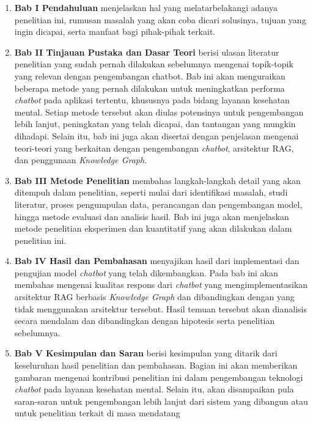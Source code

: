 \begin{enumerate}
	\item \textbf{Bab I Pendahuluan} menjelaskan hal yang melatarbelakangi adanya penelitian ini, rumusan masalah yang akan coba dicari solusinya, tujuan yang ingin dicapai, serta manfaat bagi pihak-pihak terkait.
	\item \textbf{Bab II Tinjauan Pustaka dan Dasar Teori} berisi ulasan literatur penelitian yang sudah pernah dilakukan sebelumnya mengenai topik-topik yang relevan dengan pengembangan chatbot.
	      Bab ini akan menguraikan beberapa metode yang pernah dilakukan untuk meningkatkan performa \textit{chatbot} pada aplikasi tertentu, khususnya pada bidang layanan kesehatan mental.
	      Setiap metode tersebut akan diulas potensinya untuk pengembangan lebih lanjut, peningkatan yang telah dicapai, dan tantangan yang mungkin dihadapi.
	      Selain itu, bab ini juga akan disertai dengan penjelasan mengenai teori-teori yang berkaitan dengan pengembangan \textit{chatbot}, arsitektur RAG, dan penggunaan \textit{Knowledge Graph}.
	\item \textbf{Bab III Metode Penelitian} membahas langkah-langkah detail yang akan ditempuh dalam penelitian, seperti mulai dari identifikasi masalah, studi literatur, proses pengumpulan data, perancangan dan pengembangan model, hingga metode evaluasi dan analisis hasil.
	      Bab ini juga akan menjelaskan metode penelitian eksperimen dan kuantitatif yang akan dilakukan dalam penelitian ini.
	\item \textbf{Bab IV Hasil dan Pembahasan} menyajikan hasil dari implementasi dan pengujian model \textit{chatbot} yang telah dikembangkan.
	      Pada bab ini akan membahas mengenai kualitas respons dari \textit{chatbot} yang mengimplementasikan arsitektur RAG berbasis \textit{Knowledge Graph} dan dibandingkan dengan yang tidak menggunakan arsitektur tersebut.
	      Hasil temuan tersebut akan dianalisis secara mendalam dan dibandingkan dengan hipotesis serta penelitian sebelumnya.
	\item \textbf{Bab V Kesimpulan dan Saran}  berisi kesimpulan yang ditarik dari keseluruhan hasil penelitian dan pembahasan.
	      Bagian ini akan memberikan gambaran mengenai kontribusi penelitian ini dalam pengembangan teknologi \textit{chatbot} pada layanan kesehatan mental.
	      Selain itu, akan disampaikan pula saran-saran untuk pengembangan lebih lanjut dari sistem yang dibangun atau untuk penelitian terkait di masa mendatang
\end{enumerate}